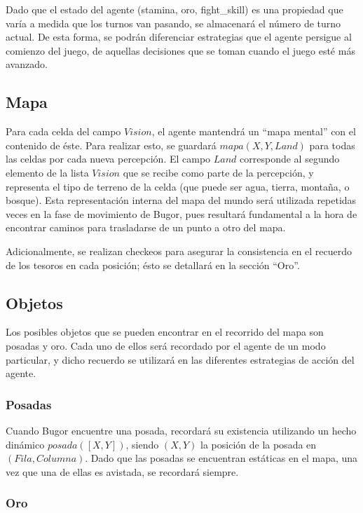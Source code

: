 \documentclass[a4paper,10pt,spanish]{article}
\begin{document}
	Dado que el estado del agente (stamina, oro, fight\_skill) es una propiedad que var\'ia a medida que los turnos van pasando, se almacenar\'a el n\'umero de turno actual. De esta forma, se podr\'an diferenciar estrategias que el agente persigue al comienzo del juego, de aquellas decisiones que se toman cuando el juego est\'e m\'as avanzado.
	
	\subsection{Mapa}
	
	Para cada celda del campo $Vision$, el agente mantendr\'a un ``mapa mental'' con el contenido de \'este. Para realizar esto, se guardar\'a $mapa(X, Y, Land)$ para todas las celdas por cada nueva percepci\'on. El campo $Land$ corresponde al segundo elemento de la lista $Vision$ que se recibe como parte de la percepci\'on, y representa el tipo de terreno de la celda (que puede ser agua, tierra, monta\~na, o bosque). Esta representaci\'on interna del mapa del mundo ser\'a utilizada repetidas veces en la fase de movimiento de Bugor, pues resultar\'a fundamental a la hora de encontrar caminos para trasladarse de un punto a otro del mapa.
	
	Adicionalmente, se realizan checkeos para asegurar la consistencia en el recuerdo de los tesoros en cada posici\'on; \'esto se detallar\'a en la secci\'on ``Oro''.

	\subsection{Objetos}
	
	Los posibles objetos que se pueden encontrar en el recorrido del mapa son posadas y oro. Cada uno de ellos ser\'a recordado por el agente de un modo particular, y dicho recuerdo se utilizar\'a en las diferentes estrategias de acci\'on del agente.
	
		\subsubsection{Posadas}
		
		Cuando Bugor encuentre una posada, recordar\'a su existencia utilizando un hecho din\'amico $posada([X, Y])$, siendo $(X, Y)$ la posici\'on de la posada en $(Fila,Columna)$. Dado que las posadas se encuentran est\'aticas en el mapa, una vez que una de ellas es avistada, se recordar\'a siempre.
		
		\subsubsection{Oro}
		
\end{document}
